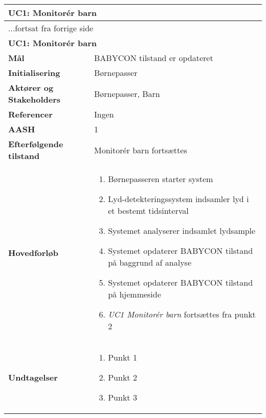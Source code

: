 \begin{center} \centering \label{kravspec:uc1}
	\begin{longtable}{|p{5cm}|p{9cm}|}  %
	\hline
		\multicolumn{2}{|l|}{\textbf{UC1: Monitorér barn}} \\\hline %
		\endfirsthead
		
		\multicolumn{2}{l}{...fortsat fra forrige side} \\ \hline %
		\multicolumn{2}{|l|}{\textbf{UC1: Monitorér barn}} \\\hline %
		\endhead	
		
		\textbf{Mål}							&BABYCON tilstand er opdateret		\\\hline
		\textbf{Initialisering}				&Børnepasser		\\\hline
		\textbf{Aktører og Stakeholders}		&Børnepasser, Barn		\\\hline 
		\textbf{Referencer}					&Ingen		\\\hline
		\textbf{AASH}						&1		\\\hline
		\textbf{Efterfølgende tilstand}		&Monitorér barn fortsættes		\\\hline
		\textbf{Hovedforløb}					
			&\begin{enumerate}
	
				\item Børnepasseren starter system
				
				\item Lyd-detekteringssystem indsamler lyd i et bestemt tidsinterval 				
				
				\item Systemet analyserer indsamlet lydsample 
				
				\item Systemet opdaterer BABYCON tilstand på baggrund af analyse
				
				\item Systemet opdaterer BABYCON tilstand på hjemmeside 
				
				\item \textit{UC1 Monitorér barn} fortsættes fra punkt 2
				
			\end{enumerate}
		\\\hline
		\textbf{Undtagelser}
			&\begin{enumerate}
			
				\item Punkt 1

				\item Punkt 2
				
				\item Punkt 3

			\end{enumerate}
		\\\hline
	\end{longtable} 
\end{center}

